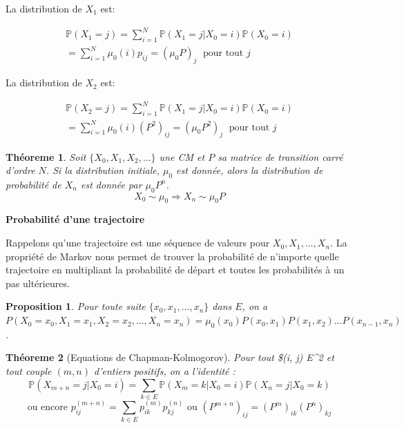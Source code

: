\documentclass[
]{book}
\newtheorem{theorem}{Théoreme}[chapter]
\newtheorem{proposition}{Proposition}[chapter]
\theoremstyle{definition}
\theoremstyle{definition}
\theoremstyle{definition}
\theoremstyle{remark}
\begin{document}
La distribution de \(X_1\) est:

\begin{align*} 
\mathbb{P}(X_1 = j) = \sum_{i=1}^N \mathbb{P}(X_1 = j | X_0 = i)\mathbb{P}(X_0 = i) \\
=
\sum_{i=1}^N \mu_0(i) p_{ij}=(\mu_0 P)_j\; \text{ pour tout }j
\end{align*}

La distribution de \(X_2\) est:

\begin{align*} 
\mathbb{P}(X_2 = j) = \sum_{i=1}^N \mathbb{P}(X_1 = j | X_0 = i)\mathbb{P}(X_0 = i) \\
=
\sum_{i=1}^N \mu_0(i) (P^2)_{ij}=(\mu_0 P^2)_j\; \text{ pour tout }j
\end{align*}

\begin{theorem}
\protect\hypertarget{thm:unnamed-chunk-16}{}{\label{thm:unnamed-chunk-16} }Soit \(\{X_0, X_1, X_2, \ldots \}\) une CM et \(P\) sa matrice de transition carré d'ordre \(N\). Si la distribution initiale, \(\mu_0\) est donnée, alors la distribution de probabilité de \(X_n\) est donnée par \(\mu_0 P^n\).
\[
X_0 \sim \mu_0 \Longrightarrow X_n \sim \mu_0 P
\]
\end{theorem}

\textbf{Probabilité d'une trajectoire}

Rappelons qu'une trajectoire est une séquence
de valeurs pour \(X_0, X_1,\ldots, X_n\). La propriété de Markov nous permet de trouver la probabilité de n'importe quelle trajectoire en multipliant la probabilité de départ et toutes les probabilités à un pas ultérieures.

\begin{proposition}
\protect\hypertarget{prp:unnamed-chunk-17}{}{\label{prp:unnamed-chunk-17} }Pour toute suite \(\{x_0, x_1, \ldots , x_n\}\) dans \(E\), on a
\(P(X_0 = x_0, X_1 = x_1,X_2 = x_2, \ldots , X_n = x_n) =\mu_0(x_0)P(x_0, x_1)P(x_1, x_2)\ldots P(x_{n−1}, x_n)\).
\end{proposition}

\begin{theorem}[Equations de Chapman-Kolmogorov]
\protect\hypertarget{thm:unnamed-chunk-18}{}{\label{thm:unnamed-chunk-18} {} }Pour tout \$(i, j) \in E\^{}2 et tout couple \((m, n)\) d'entiers positifs, on a l'identité :
\[
\mathbb{P}(X_{m+n} = j|X_0 = i) = \sum_{k\in E}
\mathbb{P}(X_m = k|X_0 = i)\mathbb{P}(X_n = j|X_0 = k)\]
\[\text{ou encore }
p^{(m+n)}_{ij} = \sum_{k \in E} p^{(m)}_{ik} p^{(n)}_{kj} \text{ ou } (P^{m+n})_{ij}=(P^m)_{ik}(P^n)_{kj}\]
\end{theorem}
\end{document}

